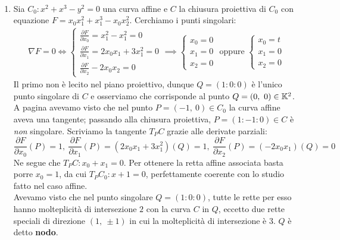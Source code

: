\begin{examples}~{} \label{esempi lez 35}
	\begin{enumerate}
		\item	Sia $C_0\colon x^2+x^3-y^2=0$ una curva affine e $C$ la chiusura proiettiva di $C_0$ con equazione $F=x_0x_1^2+x_1^3-x_0x_2^2$. Cerchiamo i punti singolari:
			\begin{gather*}
				\nabla F=0 \iff \begin{cases}
					\frac{\partial{F}}{\partial{x_0}}=x_1^2 - x_1^2=0\\
					\frac{\partial{F}}{\partial{x_1}}=2x_0x_1+3x_1^2=0\\
					\frac{\partial{F}}{\partial{x_2}}-2x_0x_2=0
				\end{cases} \implies \begin{cases}
					x_0=0 \\ x_1=0 \\ x_2=0
				\end{cases} \text{ oppure } \begin{cases}
					x_0=t \\ x_1=0 \\ x_2=0
				\end{cases}
			\end{gather*}
		Il primo non è lecito nel piano proiettivo, dunque $Q=(1\colon 0\colon 0)$ è l'unico punto singolare di $C$ e osserviamo che corrisponde al punto $Q=(0,\ 0)\in\kamp^2$.\\
		A pagina \pageref{esempiocurvaq} avevamo visto che nel punto $P=(-1,\ 0)\in C_0$ la curva affine aveva una tangente; passando alla chiusura proiettiva, $P=(1\colon -1\colon 0)\in C$ è \textit{non} singolare. Scriviamo la tangente $T_P C$ grazie alle derivate parziali:
		\begin{equation*}
			\frac{\partial{F}}{\partial{x_0}}\left(P\right)=1,\ \frac{\partial{F}}{\partial{x_1}}\left(P\right)=(2x_0x_1+3x_1^2)\left(Q\right)=1,\ \frac{\partial{F}}{\partial{x_2}}\left(P\right)=(-2x_0x_1)\left(Q\right)=0
		\end{equation*}
		Ne segue che $T_P C\colon x_0+x_1=0$. Per ottenere la retta affine associata basta porre $x_0=1$, da cui $T_P C_0\colon x+1=0$, perfettamente coerente con lo studio fatto nel caso affine.\\
		Avevamo visto che nel punto singolare $Q=(1\colon 0\colon 0)$, tutte le rette per esso hanno molteplicità di intersezione $2$ con la curva $C$ in $Q$, eccetto due rette speciali di direzione $(1,\ \pm 1)$ in cui la molteplicità di intersezione è 3. $Q$ è detto \textbf{nodo}.

\end{enumerate}
\end{examples}
